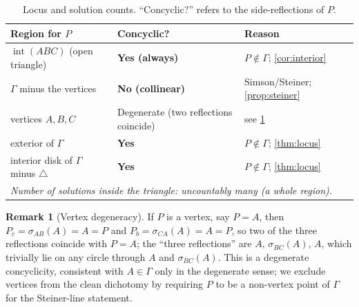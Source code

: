 \documentclass[11pt,a4paper]{article}
\theoremstyle{definition}
\newtheorem{remark}[theorem]{Remark}
\newcommand{\Pb}{P_{b}}
\newcommand{\Pc}{P_{c}}
\newcommand{\circc}{\Gamma}
\begin{document}
\begin{table}[h]
\centering
\caption{Locus and solution counts. ``Concyclic?'' refers to the side-reflections of $P$.}
\label{tab:locus}
\begin{tabular}{lll}
\toprule
Region for $P$ & Concyclic? & Reason \\
\midrule
$\operatorname{int}(ABC)$ (open triangle) & \textbf{Yes (always)} & $P\notin\circc$; \cref{cor:interior} \\
$\circc$ minus the vertices & \textbf{No (collinear)} & Simson/Steiner; \cref{prop:steiner} \\
vertices $A,B,C$ & Degenerate (two reflections coincide) & see \cref{rem:vertex} \\
exterior of $\circc$ & \textbf{Yes} & $P\notin\circc$; \cref{thm:locus} \\
interior disk of $\circc$ minus $\triangle$ & \textbf{Yes} & $P\notin\circc$; \cref{thm:locus} \\
\midrule
\multicolumn{3}{l}{\emph{Number of solutions inside the triangle: uncountably many (a whole region).}} \\
\bottomrule
\end{tabular}
\end{table}

\begin{remark}[Vertex degeneracy]\label{rem:vertex}
If $P$ is a vertex, say $P=A$, then $\Pc=\sigma_{AB}(A)=A=P$ and $\Pb=\sigma_{CA}(A)=A=P$, so two of the three reflections coincide with $P=A$; the ``three reflections'' are $A,\,\sigma_{BC}(A),\,A$, which trivially lie on any circle through $A$ and $\sigma_{BC}(A)$. This is a degenerate concyclicity, consistent with $A\in\circc$ only in the degenerate sense; we exclude vertices from the clean dichotomy by requiring $P$ to be a non-vertex point of $\circc$ for the Steiner-line statement.
\end{remark}
\end{document}
